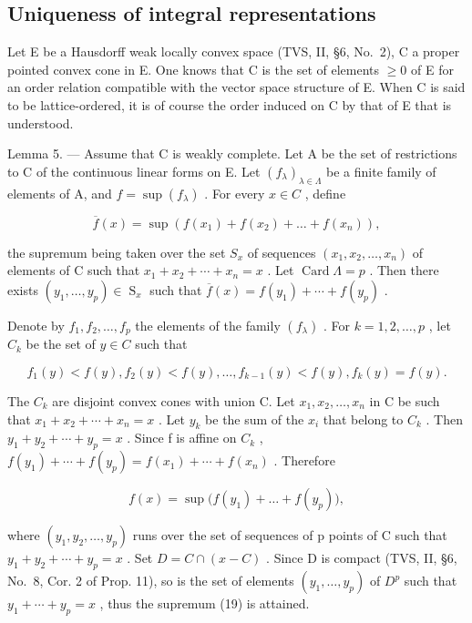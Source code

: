 \subsection{Uniqueness of integral representations}

Let E be a Hausdorff weak locally convex space (TVS, II, §6, No.~2), C a proper pointed convex cone in E. One knows that C is the set of elements \(\geqslant0\) of E for an order relation compatible with the vector space structure of E. When C is said to be lattice-ordered, it is of course the order induced on C by that of E that is understood.

Lemma 5. --- Assume that C is weakly complete. Let A be the set of restrictions to C of the continuous linear forms on E. Let \((f_{\lambda})_{\lambda \in \Lambda}\) be a finite family of elements of A, and \(f = \sup(f_{\lambda})\) . For every \(x \in C\) , define

\[
\overline {{{f}}} (x) = \sup \left(f (x _ {1}) + f (x _ {2}) + \dots + f (x _ {n})\right),
\]

the supremum being taken over the set \(S_{x}\) of sequences \((x_{1}, x_{2}, \ldots, x_{n})\) of elements of C such that \(x_{1} + x_{2} + \cdots + x_{n} = x\) . Let \(\operatorname{Card}\Lambda = p\) . Then there exists \((y_{1}, \ldots, y_{p}) \in \operatorname{S}_{x}\) such that \(\overline{f}(x) = f(y_{1}) + \cdots + f(y_{p})\) .

Denote by \(f_1, f_2, \ldots, f_p\) the elements of the family \((f_\lambda)\) . For \(k = 1, 2, \ldots, p\) , let \(C_k\) be the set of \(y \in C\) such that

\[
f _ {1} (y) <   f (y), f _ {2} (y) <   f (y), \dots , f _ {k - 1} (y) <   f (y), f _ {k} (y) = f (y).
\]

The \(C_{k}\) are disjoint convex cones with union C. Let \(x_{1}, x_{2}, \ldots, x_{n}\) in C be such that \(x_{1} + x_{2} + \cdots + x_{n} = x\) . Let \(y_{k}\) be the sum of the \(x_{i}\) that belong to \(C_{k}\) . Then \(y_{1} + y_{2} + \cdots + y_{p} = x\) . Since f is affine on \(C_{k}\) , \(f(y_{1}) + \cdots + f(y_{p}) = f(x_{1}) + \cdots + f(x_{n})\) . Therefore

\[
f (x) = \sup \bigl (f (y _ {1}) + \dots + f (y _ {p}) \bigr),\tag{19}
\]

where \((y_{1}, y_{2}, \ldots, y_{p})\) runs over the set of sequences of p points of C such that \(y_{1} + y_{2} + \cdots + y_{p} = x\) . Set \(D = C \cap (x - C)\) . Since D is compact (TVS, II, §6, No.~8, Cor. 2 of Prop. 11), so is the set of elements \((y_{1}, \ldots, y_{p})\) of \(D^{p}\) such that \(y_{1} + \cdots + y_{p} = x\) , thus the supremum (19) is attained.

